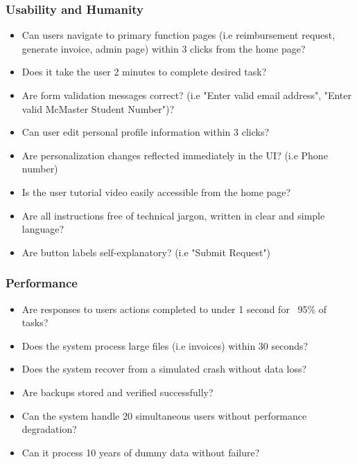 \documentclass[12pt, titlepage]{article}
\begin{document}
\hypertarget{checklist-nfr11}{}
\subsubsection{Usability and Humanity}
  \begin{itemize}[label=$\square$] %
    \item Can users navigate to primary function pages (i.e reimbursement request, generate invoice, admin page) within 3 clicks from the home page?
    \item Does it take the user 2 minutes to complete desired task?
    \item Are form validation messages correct? (i.e "Enter valid email address", "Enter valid McMaster Student Number")?
    \item Can user edit personal profile information within 3 clicks?
    \item Are personalization changes reflected immediately in the UI? (i.e Phone number)
    \item Is the user tutorial video easily accessible from the home page?
    \item Are all instructions free of technical jargon, written in clear and simple language?
    \item Are button labels self-explanatory? (i.e "Submit Request")
  \end{itemize}

\hypertarget{checklist-nfr12}{}
\subsubsection{Performance}
  \begin{itemize}[label=$\square$] %
    \item Are responses to users actions completed to under 1 second for ~95\% of tasks?
    \item Does the system process large files (i.e invoices) within 30 seconds?
    \item Does the system recover from a simulated crash without data loss?
    \item Are backups stored and verified successfully?
    \item Can the system handle 20 simultaneous users without performance degradation?
    \item Can it process 10 years of dummy data without failure?
  \end{itemize}
\end{document}
